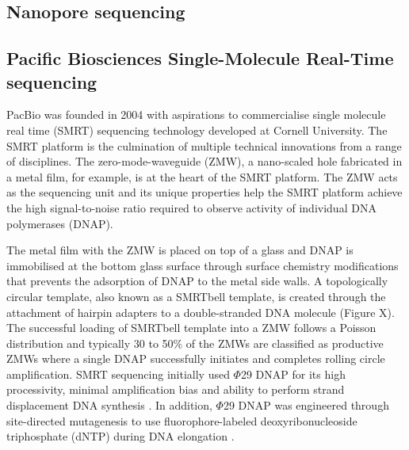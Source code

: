 \subsection{Nanopore sequencing}


\subsection{Pacific Biosciences Single-Molecule Real-Time sequencing}

PacBio was founded in 2004 with aspirations to commercialise single molecule real time (SMRT) sequencing technology developed at Cornell University. The SMRT platform is the culmination of multiple technical innovations from a range of disciplines. The zero-mode-waveguide (ZMW), a nano-scaled hole fabricated in a metal film, for example, is at the heart of the SMRT platform. The ZMW acts as the sequencing unit and its unique properties help the SMRT platform achieve the high signal-to-noise ratio required to observe activity of individual DNA polymerases (DNAP)\cite{Levene2003-og}. 

The metal film with the ZMW is placed on top of a glass and DNAP is immobilised at the bottom glass surface through surface chemistry modifications that prevents the adsorption of DNAP to the metal side walls\cite{Korlach2008-aq, Eid2009-ol}. A topologically circular template, also known as a SMRTbell template, is created through the attachment of hairpin adapters to a double-stranded DNA molecule (Figure X). The successful loading of SMRTbell template into a ZMW follows a Poisson distribution and typically 30 to 50\% of the ZMWs are classified as productive ZMWs where a single DNAP successfully initiates and completes rolling circle amplification. SMRT sequencing initially used $\Phi$29 DNAP for its high processivity, minimal amplification bias and ability to perform strand displacement DNA synthesis \cite{Eid2009-ol}. In addition, $\Phi$29 DNAP was engineered through site-directed mutagenesis to use fluorophore-labeled deoxyribonucleoside triphosphate (dNTP) during DNA elongation \cite{Korlach2008-fv,Eid2009-ol}. 

